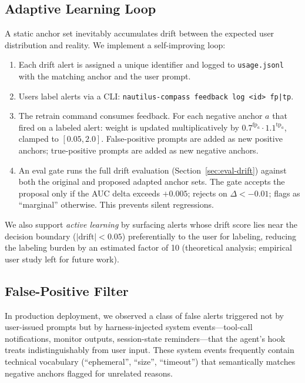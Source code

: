 \subsection{Adaptive Learning Loop}
\label{sec:method-adaptive}

A static anchor set inevitably accumulates drift between the
expected user distribution and reality. We implement a
self-improving loop:

\begin{enumerate}
\item Each drift alert is assigned a unique identifier and
  logged to \texttt{usage.jsonl} with the matching anchor and
  the user prompt.
\item Users label alerts via a CLI:
  \texttt{nautilus-compass feedback log <id> fp|tp}.
\item The retrain command consumes feedback. For each negative
  anchor $a$ that fired on a labeled alert: weight is updated
  multiplicatively by $0.7^{\mathrm{fp}_a} \cdot 1.1^{\mathrm{tp}_a}$,
  clamped to $[0.05, 2.0]$. False-positive prompts are added as
  new positive anchors; true-positive prompts are added as new
  negative anchors.
\item An eval gate runs the full drift evaluation
  (Section~\ref{sec:eval-drift}) against both the original and
  proposed adapted anchor sets. The gate accepts the proposal
  only if the AUC delta exceeds $+0.005$; rejects on
  $\Delta < -0.01$; flags as ``marginal'' otherwise. This
  prevents silent regressions.
\end{enumerate}

We also support \emph{active learning} by surfacing alerts whose
drift score lies near the decision boundary
($|\mathrm{drift}| < 0.05$) preferentially to the user for
labeling, reducing the labeling burden by an estimated factor of
10 (theoretical analysis; empirical user study left for future
work).

\subsection{False-Positive Filter}
\label{sec:method-fpfilter}

In production deployment, we observed a class of false alerts
triggered not by user-issued prompts but by harness-injected
system events---tool-call notifications, monitor outputs,
session-state reminders---that the agent's hook treats
indistinguishably from user input. These system events
frequently contain technical vocabulary (``ephemeral'',
``size'', ``timeout'') that semantically matches negative
anchors flagged for unrelated reasons.


